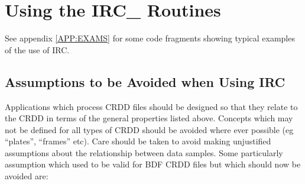 
\section {Using the IRC\_ Routines}
See appendix \ref {APP:EXAMS} for some code fragments showing typical examples 
of the use of IRC.

\subsection {Assumptions to be Avoided when Using IRC}
Applications which process CRDD files should be designed so that they relate to
the CRDD in terms of the general properties listed above. Concepts which may not
be defined for all types of CRDD should be avoided where ever possible (eg
``plates'', ``frames'' etc). Care should be taken to avoid making unjustified
assumptions about the relationship between data samples. Some particularly
assumption which used to be valid for BDF CRDD files but which should now be
avoided are:

